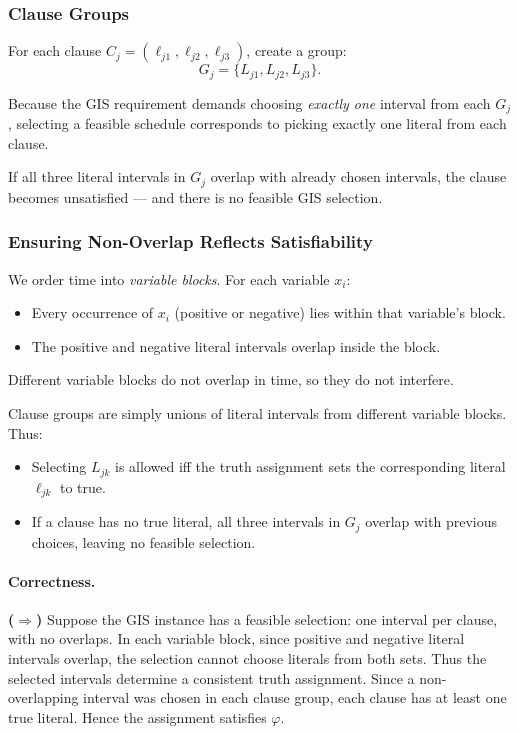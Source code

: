 \documentclass[9pt]{extarticle}
\begin{document}
\subsubsection*{Clause Groups}

For each clause $C_j = (\ell_{j1},\ell_{j2},\ell_{j3})$, create a group:
\[
G_j = \big\{ L_{j1}, L_{j2}, L_{j3} \big\}.
\]

Because the GIS requirement demands choosing \emph{exactly one} interval from
each $G_j$, selecting a feasible schedule corresponds to picking exactly one
literal from each clause.

If all three literal intervals in $G_j$ overlap with already chosen intervals,
the clause becomes unsatisfied --- and there is no feasible GIS selection.

\subsubsection*{Ensuring Non-Overlap Reflects Satisfiability}

We order time into \emph{variable blocks}.  
For each variable $x_i$:
\begin{itemize}
    \item Every occurrence of $x_i$ (positive or negative) lies within that
          variable’s block.
    \item The positive and negative literal intervals overlap inside the block.
\end{itemize}

Different variable blocks do not overlap in time, so they do not interfere.

Clause groups are simply unions of literal intervals from different variable
blocks.  Thus:

\begin{itemize}
    \item Selecting $L_{jk}$ is allowed iff the truth assignment sets the
          corresponding literal $\ell_{jk}$ to true.
    \item If a clause has no true literal, all three intervals in $G_j$ overlap
          with previous choices, leaving no feasible selection.
\end{itemize}

\paragraph{Correctness.}

\textbf{($\Rightarrow$)}  
Suppose the GIS instance has a feasible selection: one interval per clause,
with no overlaps.  
In each variable block, since positive and negative literal intervals overlap,
the selection cannot choose literals from both sets.  
Thus the selected intervals determine a consistent truth assignment.  
Since a non-overlapping interval was chosen in each clause group, each clause
has at least one true literal.  
Hence the assignment satisfies $\varphi$.
\end{document}
